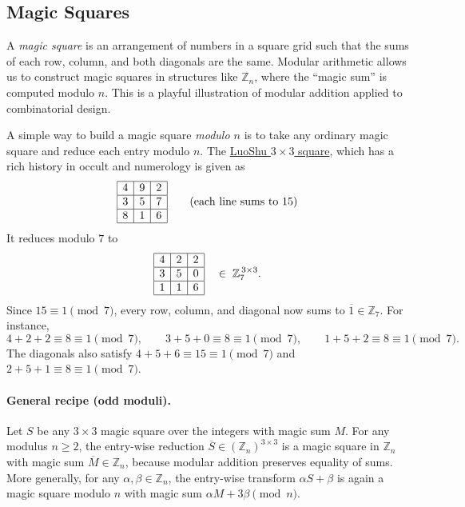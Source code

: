 \subsection{Magic Squares}
A \emph{magic square} is an arrangement of numbers in a square grid such that the sums of each row, column, 
and both diagonals are the same. Modular arithmetic allows us to construct magic squares 
in structures like $\mathbb{Z}_n$, where the “magic sum” is computed modulo $n$.  
This is a playful illustration of modular addition applied to combinatorial design. 

A simple way to build a magic square \emph{modulo $n$} is to take any ordinary magic square
and reduce each entry modulo $n$. The \href{https://en.wikipedia.org/wiki/Luoshu\_Square}{LuoShu $3\times 3$ square}, which has a rich history in occult and numerology is given as
\[
\begin{array}{|c|c|c|}
\hline
4 & 9 & 2 \\
\hline
3 & 5 & 7 \\
\hline
8 & 1 & 6 \\
\hline
\end{array}
\qquad\text{(each line sums to $15$)}
\]
It reduces modulo $7$ to
\[
\begin{array}{|c|c|c|}
\hline
4 & 2 & 2 \\
\hline
3 & 5 & 0 \\
\hline
1 & 1 & 6 \\
\hline
\end{array}
\quad\in\; \mathbb{Z}_7^{\,3\times 3}.
\]
Since $15\equiv 1\pmod{7}$, every row, column, and diagonal now sums to $\overline{1}\in\mathbb{Z}_7$.
For instance,
\[
4+2+2 \equiv 8 \equiv 1 \pmod{7},\qquad
3+5+0 \equiv 8 \equiv 1 \pmod{7},\qquad
1+5+2 \equiv 8 \equiv 1 \pmod{7}.
\]
The diagonals also satisfy $4+5+6\equiv 15\equiv 1\pmod{7}$ and $2+5+1\equiv 8\equiv 1\pmod{7}$.

\paragraph{General recipe (odd moduli).}
Let $S$ be any $3\times 3$ magic square over the integers with magic sum $M$.
For any modulus $n\ge 2$, the entry-wise reduction $\overline{S}\in(\mathbb{Z}_n)^{3\times 3}$ is a
magic square in $\mathbb{Z}_n$ with magic sum $\overline{M}\in\mathbb{Z}_n$,
because modular addition preserves equality of sums. More generally, for any $\alpha,\beta\in\mathbb{Z}_n$,
the entry-wise  transform $\alpha S+\beta$ is again a magic square modulo $n$ with magic sum
$\alpha M+3\beta \pmod{n}$.

